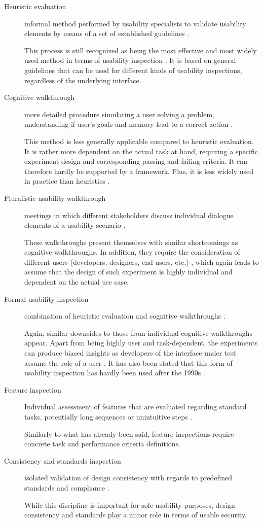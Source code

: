 \begin{description}
	\item[Heuristic evaluation] informal method performed by usability specialists to validate usability elements by means of a set of established guidelines \cite{nielsen_usability_1994}.
	
	This process is still recognized as being the most effective and most widely used method in terms of usability inspection \cite{hollingsed_usability_2007}. It is based on general guidelines that can be used for different kinds of usability inspections, regardless of the underlying interface.
	\item[Cognitive walkthrough] more detailed procedure simulating a user solving a problem, understanding if user's goals and memory lead to a correct action \cite{nielsen_usability_1994}.
	
	This method is less generally applicable compared to heuristic evaluation. It is rather more dependent on the actual task at hand, requiring a specific experiment design and corresponding passing and failing criteria. It can therefore hardly be supported by a framework. Plus, it is less widely used in practice than heuristics \cite{hollingsed_usability_2007}.
	\item[Pluralistic usability walkthrough] meetings in which different stakeholders discuss individual dialogue elements of a usability scenario \cite{nielsen_usability_1994}.
	
	These walkthroughs present themselves with similar shortcomings as cognitive walkthroughs. In addition, they require the consideration of different users (developers, designers, end users, etc.) \cite{nielsen_usability_1994}, which again leads to assume that the design of such experiment is highly individual and dependent on the actual use case.
	\item[Formal usability inspection] combination of heuristic evaluation and cognitive walkthroughs \cite{nielsen_usability_1994}.
	
	Again, similar downsides to those from individual cognitive walkthroughs appear. Apart from being highly user and task-dependent, the experiments can produce biased insights as developers of the interface under test assume the role of a user \cite{hollingsed_usability_2007}. It has also been stated that this form of usability inspection has hardly been used after the 1990s \cite{hollingsed_usability_2007}.
	\item[Feature inspection] Individual assessment of features that are evaluated regarding standard tasks, potentially long sequences or unintuitive steps \cite{nielsen_usability_1994}.
	
	Similarly to what has already been said, feature inspections require concrete task and performance criteria definitions.
	\item[Consistency and standards inspection] isolated validation of design consistency with regards to predefined standards and compliance \cite{nielsen_usability_1994}.
	
	While this discipline is important for sole usability purposes, design consistency and standards play a minor role in terms of usable security.
\end{description}

